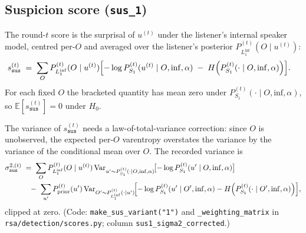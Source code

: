 \documentclass[11pt]{article}
\newcommand{\Obs}{O}                 %
\newcommand{\Utt}{u}                 %
\newcommand{\SOne}{S_1}
\newcommand{\LOne}{L_1}
\newcommand{\Pspk}[2]{P^{(#2)}_{#1}}
\newcommand{\Ent}{H}
\newcommand{\Var}{\mathrm{Var}}
\newcommand{\E}{\mathbb{E}}
\newcommand{\Inffn}{\mathrm{inf}}
\begin{document}
\subsection*{Suspicion score (\texttt{sus\_1})}

The round-$t$ score is the surprisal of $\Utt^{(t)}$ under the listener's
internal speaker model, centred per-$\Obs$ and averaged over the
listener's posterior $\Pspk{\LOne^{\Inffn}}{t}(\Obs \mid \Utt^{(t)})$:
\begin{align}
    s^{(t)}_{\texttt{sus}}
    &\;=\;
    \sum_{\Obs}
    \Pspk{\LOne^{\Inffn}}{t}(\Obs \mid \Utt^{(t)})
    \Bigl[
        -\log \Pspk{\SOne}{t}(\Utt^{(t)} \mid \Obs, \Inffn, \alpha)
        \;-\;
        \Ent\!\left(\Pspk{\SOne}{t}(\cdot \mid \Obs, \Inffn, \alpha)\right)
    \Bigr].
    \label{eq:sus-score}
\end{align}
For each fixed $\Obs$ the bracketed quantity has mean zero under
$\Pspk{\SOne}{t}(\cdot \mid \Obs, \Inffn, \alpha)$, so
$\E[s^{(t)}_{\texttt{sus}}] = 0$ under $H_0$.

The variance of $s^{(t)}_{\texttt{sus}}$ needs a law-of-total-variance
correction: since $\Obs$ is unobserved, the expected per-$\Obs$
varentropy overstates the variance by the variance of the conditional
mean over $\Obs$. The recorded variance is
\begin{align}
    \sigma^{2,(t)}_{\texttt{sus}}
    &\;=\;
    \sum_{\Obs}
        \Pspk{\LOne^{\Inffn}}{t}(\Obs \mid \Utt^{(t)})\,
        \Var_{\Utt' \sim \Pspk{\SOne}{t}(\cdot \mid \Obs, \Inffn, \alpha)}
        \!\bigl[-\log \Pspk{\SOne}{t}(\Utt' \mid \Obs, \Inffn, \alpha)\bigr]
    \notag \\
    &\quad
    -\ \sum_{\Utt'} \Pspk{\mathrm{prior}}{t}(\Utt')\,
        \Var_{\Obs' \sim \Pspk{\LOne^{\Inffn}}{t}(\cdot \mid \Utt')}
        \!\Bigl[
          -\log \Pspk{\SOne}{t}(\Utt' \mid \Obs', \Inffn, \alpha)
          - \Ent\!\left(\Pspk{\SOne}{t}(\cdot \mid \Obs', \Inffn, \alpha)\right)
        \Bigr],
    \label{eq:sus-var}
\end{align}
clipped at zero. (Code: \texttt{make\_sus\_variant("1")} and
\texttt{\_weighting\_matrix} in \texttt{rsa/detection/scores.py}; column
\texttt{sus1\_sigma2\_corrected}.)
\end{document}
